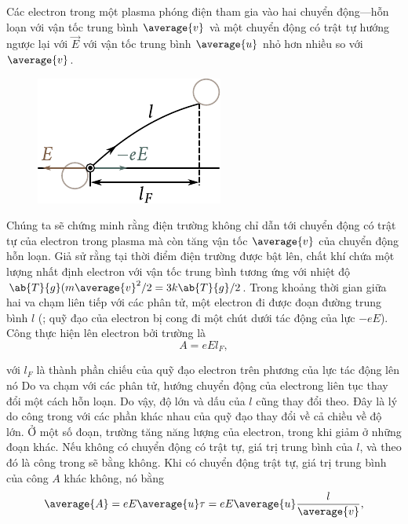 Các electron trong một plasma phóng điện tham gia vào hai chuyển động---hỗn loạn với vận tốc trung bình $\average{v}$ và một chuyển động có trật tự hướng ngược lại với $\vec{E}$ với vận tốc trung bình $\average{u}$ nhỏ hơn nhiều so với $\average{v}$.

\begin{figure}[t]
	\begin{center}
		\includegraphics[scale=1]{figures/ch_12/fig_12_7.pdf}
		\caption[]{}
		\label{fig:12_7}
	\end{center}
	\vspace{-0.8cm}
\end{figure}

Chúng ta sẽ chứng minh rằng điện trường không chỉ dẫn tới chuyển động có trật tự của electron trong plasma mà còn tăng vận tốc $\average{v}$ của chuyển động hỗn loạn.
Giả sử rằng tại thời điểm điện trường được bật lên, chất khí chứa một lượng nhất định electron với vận tốc trung bình tương ứng với nhiệt độ $\ab{T}{g} (m\average{v}^2/2 = 3k\ab{T}{g}/2$.
Trong khoảng thời gian giữa hai va chạm liên tiếp với các phân tử, một electron đi được đoạn đường trung bình $l$ (; quỹ đạo của electron bị cong đi một chút dưới tác động của lực $-eE$).
Công thực hiện lên electron bởi trường là
\begin{equation}\label{eq:12_16}
    A = e E l_F,
\end{equation}

\noindent
với $l_F$ là thành phần chiếu của quỹ đạo electron trên phương của lực tác động lên nó
Do va chạm với các phân tử, hướng chuyển động của electrong liên tục thay đổi một cách hỗn loạn.
Do vậy, độ lớn và dấu của $l$ cũng thay đổi theo.
Đây là lý do công trong  với các phần khác nhau của quỹ đạo thay đổi về cả chiều về độ lớn.
Ở một số đoạn, trường tăng năng lượng của electron, trong khi giảm ở những đoạn khác.
Nếu không có chuyển động có trật tự, giá trị trung bình của $l$, và theo đó là công trong  sẽ bằng không.
Khi có chuyển động trật tự, giá trị trung bình của công $A$ khác không, nó bằng
\begin{equation}\label{eq:12_17}
    \average{A} = e E \average{u} \tau = e E \average{u} \frac{l}{\average{v}},
\end{equation}

